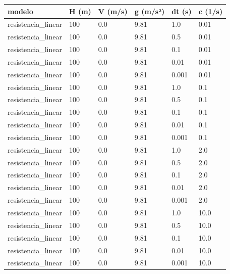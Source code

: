 \begin{tabular}{llllll}
\toprule
modelo & H (m) & V (m/s) & g (m/s²) & dt (s) & c (1/s) \\
\midrule
resistencia\_linear & 100 & 0.0 & 9.81 & 1.0 & 0.01 \\
resistencia\_linear & 100 & 0.0 & 9.81 & 0.5 & 0.01 \\
resistencia\_linear & 100 & 0.0 & 9.81 & 0.1 & 0.01 \\
resistencia\_linear & 100 & 0.0 & 9.81 & 0.01 & 0.01 \\
resistencia\_linear & 100 & 0.0 & 9.81 & 0.001 & 0.01 \\
resistencia\_linear & 100 & 0.0 & 9.81 & 1.0 & 0.1 \\
resistencia\_linear & 100 & 0.0 & 9.81 & 0.5 & 0.1 \\
resistencia\_linear & 100 & 0.0 & 9.81 & 0.1 & 0.1 \\
resistencia\_linear & 100 & 0.0 & 9.81 & 0.01 & 0.1 \\
resistencia\_linear & 100 & 0.0 & 9.81 & 0.001 & 0.1 \\
resistencia\_linear & 100 & 0.0 & 9.81 & 1.0 & 2.0 \\
resistencia\_linear & 100 & 0.0 & 9.81 & 0.5 & 2.0 \\
resistencia\_linear & 100 & 0.0 & 9.81 & 0.1 & 2.0 \\
resistencia\_linear & 100 & 0.0 & 9.81 & 0.01 & 2.0 \\
resistencia\_linear & 100 & 0.0 & 9.81 & 0.001 & 2.0 \\
resistencia\_linear & 100 & 0.0 & 9.81 & 1.0 & 10.0 \\
resistencia\_linear & 100 & 0.0 & 9.81 & 0.5 & 10.0 \\
resistencia\_linear & 100 & 0.0 & 9.81 & 0.1 & 10.0 \\
resistencia\_linear & 100 & 0.0 & 9.81 & 0.01 & 10.0 \\
resistencia\_linear & 100 & 0.0 & 9.81 & 0.001 & 10.0 \\
\bottomrule
\end{tabular}
